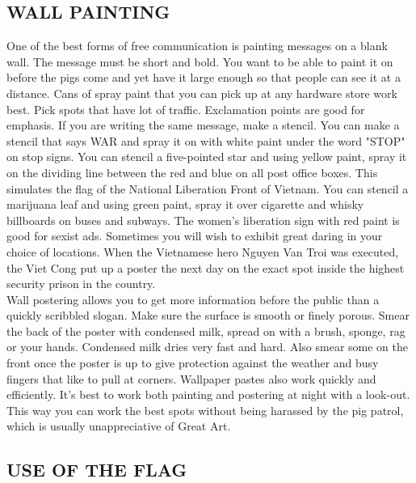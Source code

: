 \documentclass[11pt,twoside,a4paper]{book}
\begin{document}
\subsection{WALL PAINTING}

One of the best forms of free communication is painting messages on a blank wall. The message must be short and bold. You want to be able to paint it on before the pigs come and yet have it large enough so that people can see it at a distance. Cans of spray paint that you can pick up at any hardware store work best. Pick spots that have lot of traffic. Exclamation points are good for emphasis. If you are writing the same message, make a stencil. You can make a stencil that says WAR and spray it on with white paint under the word "STOP" on stop signs. You can stencil a five-pointed star and using yellow paint, spray it on the dividing line between the red and blue on all post office boxes. This simulates the flag of the National Liberation Front of Vietnam. You can stencil a marijuana leaf and using green paint, spray it over cigarette and whisky billboards on buses and subways. The women's liberation sign with red paint is good for sexist ads.	Sometimes you will wish to exhibit great daring in your choice of locations. When the Vietnamese hero Nguyen Van Troi was executed, the Viet Cong put up a poster the next day on the exact spot inside the highest security prison in the country.~\\

Wall postering allows you to get more information before the public than a quickly scribbled slogan. Make sure the surface is smooth or finely porous. Smear the back of the poster with condensed milk, spread on with a brush, sponge, rag or your hands. Condensed milk dries very fast and hard. Also smear some on the front once the poster is up to give protection against the weather and busy fingers that like to pull at corners. Wallpaper pastes also work quickly and efficiently. It's best to work both painting and postering at night with a look-out. This way you can work the best spots without being harassed by the pig patrol, which is usually unappreciative of Great Art.  

\clearpage

\subsection{USE OF THE FLAG}
\end{document}
